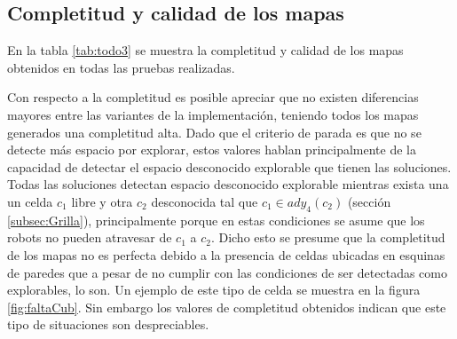 \subsection{Completitud y calidad de los mapas} \label{sec:exp:cubcal}



En la tabla \ref{tab:todo3} se muestra la completitud y calidad de los mapas
obtenidos en todas las pruebas realizadas. 

Con respecto a la completitud es posible apreciar que no existen diferencias
mayores entre las variantes de la implementación, teniendo todos los mapas
generados una completitud alta. Dado que el criterio de parada es que no se
detecte más espacio por explorar, estos valores hablan principalmente de la
capacidad de detectar el espacio desconocido explorable que tienen las
soluciones. Todas las soluciones detectan espacio desconocido explorable
mientras exista una un celda $c_1$ libre y otra $c_2$ desconocida tal que $c_1
\in ady_4(c_2)$ (sección \ref{subsec:Grilla}), principalmente porque en estas
condiciones se asume que los robots no pueden atravesar de $c_1$ a $c_2$. Dicho
esto se presume que la completitud de los mapas no es perfecta debido a la
presencia de celdas ubicadas en esquinas de paredes que a pesar de no
cumplir con las condiciones de ser detectadas como explorables, lo son. Un
ejemplo de este tipo de celda se muestra en la figura \ref{fig:faltaCub}. Sin
embargo los valores de completitud obtenidos indican que este tipo de
situaciones son despreciables.

